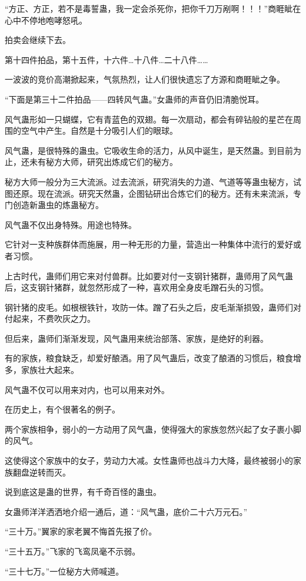 \begin{this_body}
“方正、方正，若不是毒誓蛊，我一定会杀死你，把你千刀万剐啊！！！”商睚眦在心中不停地咆哮怒吼。

拍卖会继续下去。

第十四件拍品，第十五件，十六件…十八件…二十八件……

一波波的竞价高潮掀起来，气氛热烈，让人们很快遗忘了方源和商睚眦之争。

“下面是第三十二件拍品——四转风气蛊。”女蛊师的声音仍旧清脆悦耳。

风气蛊形如一只蝴蝶，它有青蓝色的双翅。每一次扇动，都会有碎钻般的星芒在周围的空气中产生。自然是十分吸引人们的眼球。

风气蛊，是很特殊的蛊虫。它吸收生命的活力，从风中诞生，是天然蛊。到目前为止，还未有秘方大师，研究出炼成它们的秘方。

秘方大师一般分为三大流派。过去流派，研究消失的力道、气道等等蛊虫秘方，试图还原。现在流派。研究天然蛊，企图钻研出合炼它们的秘方。还有未来流派，专门创造新蛊虫的炼蛊秘方。

风气蛊不仅出身特殊。用途也特殊。

它针对一支种族群体而施展，用一种无形的力量，营造出一种集体中流行的爱好或者习惯。

上古时代，蛊师们用它来对付兽群。比如要对付一支钢针猪群，蛊师用了风气蛊后，这支钢针猪群，就忽然形成了一种，喜欢用全身皮毛蹭石头的习惯。

钢针猪的皮毛。如根根铁针，攻防一体。蹭了石头之后，皮毛渐渐损毁，蛊师们对付起来，不费吹灰之力。

但后来，蛊师们渐渐发现，风气蛊用来统治部落、家族，是绝好的利器。

有的家族，粮食缺乏，却爱好酿酒。用了风气蛊后，改变了酿酒的习惯后，粮食增多，家族壮大起来。

风气蛊不仅可以用来对内，也可以用来对外。

在历史上，有个很著名的例子。

两个家族相争，弱小的一方动用了风气蛊，使得强大的家族忽然兴起了女子裹小脚的风气。

这使得这个家族中的女子，劳动力大减。女性蛊师也战斗力大降，最终被弱小的家族翻盘逆转而灭。

说到底这是蛊的世界，有千奇百怪的蛊虫。

女蛊师洋洋洒洒地介绍一通后，道：“风气蛊，底价二十六万元石。”

“三十万。”翼家的家老翼不悔首先报了价。

“三十五万。”飞家的飞鸾凤毫不示弱。

“三十七万。”一位秘方大师喊道。


\end{this_body}

